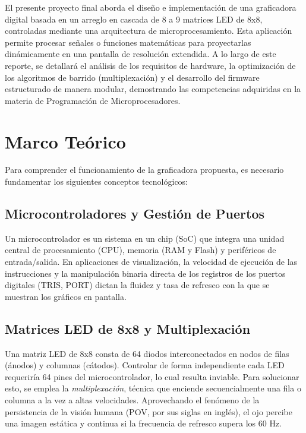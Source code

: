 El presente proyecto final aborda el diseño e implementación de una graficadora digital basada en un arreglo en cascada de 8 a 9 matrices LED de 8x8, controladas mediante una arquitectura de microprocesamiento. Esta aplicación permite procesar señales o funciones matemáticas para proyectarlas dinámicamente en una pantalla de resolución extendida. A lo largo de este reporte, se detallará el análisis de los requisitos de hardware, la optimización de los algoritmos de barrido (multiplexación) y el desarrollo del firmware estructurado de manera modular, demostrando las competencias adquiridas en la materia de Programación de Microprocesadores.

\section{Marco Teórico}

Para comprender el funcionamiento de la graficadora propuesta, es necesario fundamentar los siguientes conceptos tecnológicos:

\subsection{Microcontroladores y Gestión de Puertos}
Un microcontrolador es un sistema en un chip (SoC) que integra una unidad central de procesamiento (CPU), memoria (RAM y Flash) y periféricos de entrada/salida. En aplicaciones de visualización, la velocidad de ejecución de las instrucciones y la manipulación binaria directa de los registros de los puertos digitales (TRIS, PORT) dictan la fluidez y tasa de refresco con la que se muestran los gráficos en pantalla.

\subsection{Matrices LED de 8x8 y Multiplexación}
Una matriz LED de 8x8 consta de 64 diodos interconectados en nodos de filas (ánodos) y columnas (cátodos). Controlar de forma independiente cada LED requeriría 64 pines del microcontrolador, lo cual resulta inviable. Para solucionar esto, se emplea la \textit{multiplexación}, técnica que enciende secuencialmente una fila o columna a la vez a altas velocidades. Aprovechando el fenómeno de la persistencia de la visión humana (POV, por sus siglas en inglés), el ojo percibe una imagen estática y continua si la frecuencia de refresco supera los 60 Hz.

